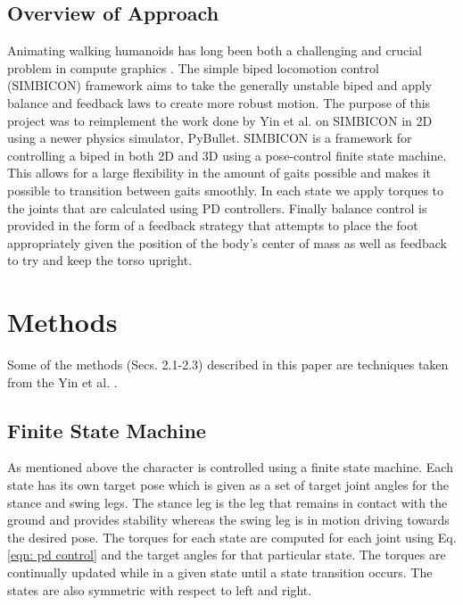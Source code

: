 \documentclass[12pt, a4paper]{article}
\begin{document}
\subsection{Overview of Approach}
Animating walking humanoids has long been both a challenging and crucial problem in compute graphics \cite{walking_survey}. The simple biped locomotion control (SIMBICON) framework \cite{Yin07} aims to take the generally unstable biped and apply balance and feedback laws to create more robust motion.  The purpose of this project was to reimplement the work done by Yin et al. \cite{Yin07} on SIMBICON in 2D using a newer physics simulator, PyBullet. SIMBICON is a framework for controlling a biped in both 2D and 3D using a pose-control finite state machine. This allows for a large flexibility in the amount of gaits possible and makes it possible to transition between gaits smoothly. In each state we apply torques to the joints that are calculated using PD controllers. Finally balance control is provided in the form of a feedback strategy that attempts to place the foot appropriately given the position of the body's center of mass as well as feedback to try and keep the torso upright.  

\newpage
\section{Methods}
Some of the methods (Secs. 2.1-2.3) described in this paper are techniques taken from the Yin et al. \cite{Yin07}. 
\subsection{Finite State Machine}
As mentioned above the character is controlled using a finite state machine. Each state has its own target pose which is given as a set of target joint angles for the stance and swing legs. The stance leg is the leg that remains in contact with the ground and provides stability whereas the swing leg is in motion driving towards the desired pose. The torques for each state are computed for each joint using Eq. \ref{eqn: pd control} and the target angles for that particular state. The torques are continually updated while in a given state until a state transition occurs. The states are also symmetric with respect to left and right. \\ 
\end{document}
